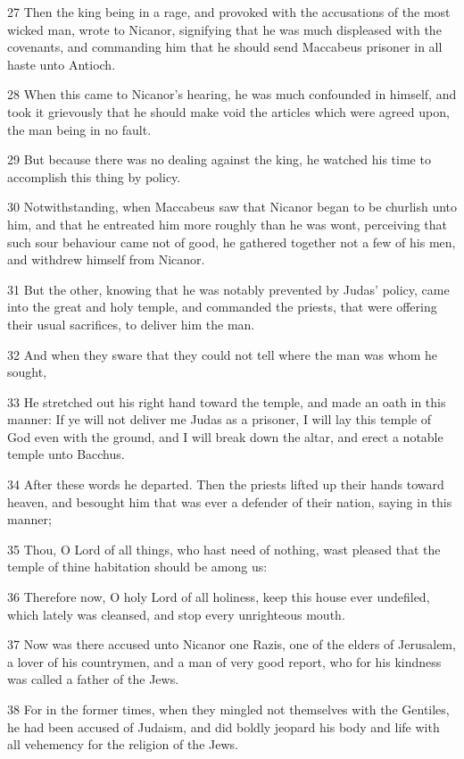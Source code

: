 \par 27 Then the king being in a rage, and provoked with the accusations of the most wicked man, wrote to Nicanor, signifying that he was much displeased with the covenants, and commanding him that he should send Maccabeus prisoner in all haste unto Antioch.
\par 28 When this came to Nicanor's hearing, he was much confounded in himself, and took it grievously that he should make void the articles which were agreed upon, the man being in no fault.
\par 29 But because there was no dealing against the king, he watched his time to accomplish this thing by policy.
\par 30 Notwithstanding, when Maccabeus saw that Nicanor began to be churlish unto him, and that he entreated him more roughly than he was wont, perceiving that such sour behaviour came not of good, he gathered together not a few of his men, and withdrew himself from Nicanor.
\par 31 But the other, knowing that he was notably prevented by Judas' policy, came into the great and holy temple, and commanded the priests, that were offering their usual sacrifices, to deliver him the man.
\par 32 And when they sware that they could not tell where the man was whom he sought,
\par 33 He stretched out his right hand toward the temple, and made an oath in this manner: If ye will not deliver me Judas as a prisoner, I will lay this temple of God even with the ground, and I will break down the altar, and erect a notable temple unto Bacchus.
\par 34 After these words he departed. Then the priests lifted up their hands toward heaven, and besought him that was ever a defender of their nation, saying in this manner;
\par 35 Thou, O Lord of all things, who hast need of nothing, wast pleased that the temple of thine habitation should be among us:
\par 36 Therefore now, O holy Lord of all holiness, keep this house ever undefiled, which lately was cleansed, and stop every unrighteous mouth.
\par 37 Now was there accused unto Nicanor one Razis, one of the elders of Jerusalem, a lover of his countrymen, and a man of very good report, who for his kindness was called a father of the Jews.
\par 38 For in the former times, when they mingled not themselves with the Gentiles, he had been accused of Judaism, and did boldly jeopard his body and life with all vehemency for the religion of the Jews.
